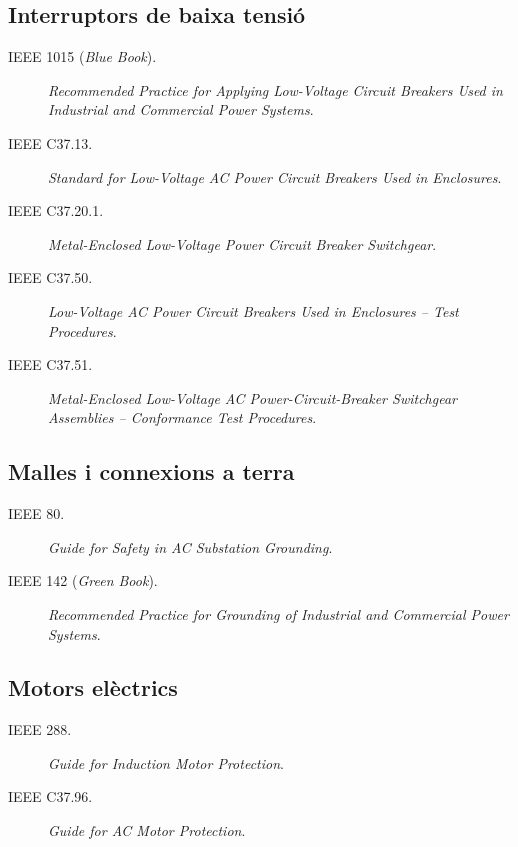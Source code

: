 \subsection*{Interruptors de baixa tensió}
\begin{description}
	\item [\hspace{5mm}IEEE 1015 (\textit{Blue Book}).] \textit{Recommended Practice for Applying Low-Voltage Circuit Breakers Used in Industrial and Commercial Power Systems}. 
     \item [\hspace{5mm}IEEE C37.13.] \textit{Standard for Low-Voltage AC Power Circuit Breakers Used in Enclosures}. 
    \item [\hspace{5mm}IEEE C37.20.1.] \textit{Metal-Enclosed Low-Voltage Power Circuit Breaker Switchgear}.
    \item [\hspace{5mm}IEEE C37.50.] \textit{Low-Voltage AC Power Circuit Breakers Used in Enclosures -- Test Procedures}.
    \item [\hspace{5mm}IEEE C37.51.] \textit{Metal-Enclosed Low-Voltage AC Power-Circuit-Breaker Switchgear Assemblies -- Conformance Test Procedures}.
\end{description}


\subsection*{Malles i connexions a terra}
\begin{description}
    \item [\hspace{5mm}IEEE 80.] \textit{Guide for Safety in AC Substation Grounding}.
    \item [\hspace{5mm}IEEE 142 (\textit{Green Book}).] \textit{Recommended Practice for Grounding of Industrial and Commercial Power Systems}.
\end{description}

\subsection*{Motors elèctrics}
\begin{description}
    \item [\hspace{5mm}IEEE 288.] \textit{Guide for Induction Motor Protection}.
    \item [\hspace{5mm}IEEE C37.96.] \textit{Guide for AC Motor Protection}.
\end{description}


